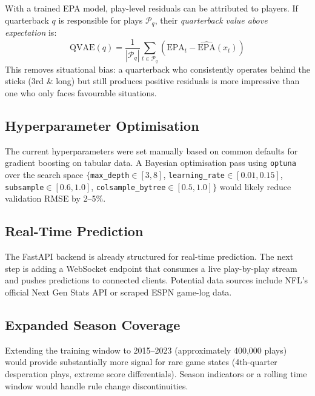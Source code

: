 \documentclass[11pt]{article}
\begin{document}
With a trained EPA model, play-level residuals can be attributed to players.
If quarterback $q$ is responsible for plays $\mathcal{P}_q$, their
\emph{quarterback value above expectation} is:
\begin{equation}
  \text{QVAE}(q) = \frac{1}{|\mathcal{P}_q|} \sum_{t \in \mathcal{P}_q}
    (\text{EPA}_t - \hat{\text{EPA}}(x_t))
\end{equation}
This removes situational bias: a quarterback who consistently operates behind
the sticks (3rd \& long) but still produces positive residuals is more impressive
than one who only faces favourable situations.

\subsection{Hyperparameter Optimisation}

The current hyperparameters were set manually based on common defaults for
gradient boosting on tabular data. A Bayesian optimisation pass using
\texttt{optuna} over the search space $\{$\texttt{max\_depth}$\in[3,8]$,
\texttt{learning\_rate}$\in[0.01,0.15]$,
\texttt{subsample}$\in[0.6,1.0]$,
\texttt{colsample\_bytree}$\in[0.5,1.0]\}$ would likely reduce validation
RMSE by 2--5\%.

\subsection{Real-Time Prediction}

The FastAPI backend is already structured for real-time prediction.
The next step is adding a WebSocket endpoint that consumes a live
play-by-play stream and pushes predictions to connected clients. Potential
data sources include NFL's official Next Gen Stats API or scraped ESPN
game-log data.

\subsection{Expanded Season Coverage}

Extending the training window to 2015--2023 (approximately 400,000 plays)
would provide substantially more signal for rare game states (4th-quarter
desperation plays, extreme score differentials). Season indicators or a
rolling time window would handle rule change discontinuities.

\end{document}
